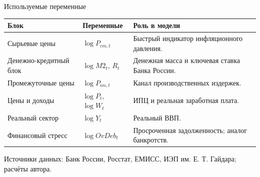 \begin{frame}{Используемые переменные}

\scriptsize
\setlength{\tabcolsep}{5pt}
\renewcommand{\arraystretch}{1.35}

\begin{tabular}{p{2.6cm} p{3.0cm} p{4.7cm}}
\hline
\textbf{Блок} & \textbf{Переменные} & \textbf{Роль в модели} \\
\hline

Сырьевые цены
& $\log P_{cm,t}$
& Быстрый индикатор инфляционного давления. \\

Денежно-кредитный блок
& $\log M2_t$, $R_t$
& Денежная масса и ключевая ставка Банка России. \\

Промежуточные цены
& $\log P_{im,t}$
& Канал производственных издержек. \\

Цены и доходы
& $\log P_t$, $\log W_t$
& ИПЦ и реальная заработная плата. \\

Реальный сектор
& $\log Y_t$
& Реальный ВВП. \\

Финансовый стресс
& $\log OvDeb_t$
& Просроченная задолженность; аналог банкротств. \\
\hline
\end{tabular}

\vspace{0.25cm}

{\tiny Источники данных: Банк России, Росстат, ЕМИСС, ИЭП им. Е. Т. Гайдара; расчёты автора.}

\end{frame}